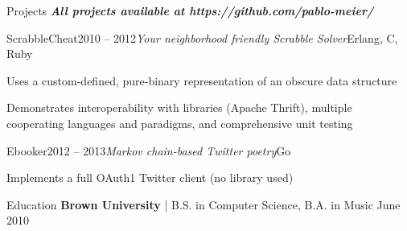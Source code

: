 \documentclass{resume} %
\begin{document}
\begin{rSection}{Projects}
\noindent{}\textbf{\textit{All projects available at https://github.com/pablo-meier/}}

\begin{rSubsection}{ScrabbleCheat}{2010 -- 2012}{\textit{Your neighborhood friendly Scrabble Solver}}{Erlang, C, Ruby}
\item Uses a custom-defined, pure-binary representation of an obscure data structure
\item Demonstrates interoperability with libraries (Apache Thrift), multiple cooperating languages and paradigms, and comprehensive unit testing
\end{rSubsection}

\begin{rSubsection}{Ebooker}{2012 -- 2013}{\textit{Markov chain-based Twitter poetry}}{Go}
\item Implements a full OAuth1 Twitter client (no library used)
\end{rSubsection}
\end{rSection}

\begin{rSection}{Education}
{\bf Brown University} | B.S. in Computer Science, B.A. in Music \hfill {June 2010} \\
\end{rSection}
\end{document}
